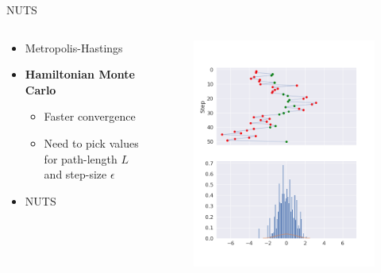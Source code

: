 \documentclass{beamer}
\begin{document}
\begin{frame}{NUTS}
\begin{columns}
\begin{column}{0.5\textwidth}
    \begin{itemize}
    \color{gray}
        \item Metropolis-Hastings
        \color{black}
        \item \textbf{Hamiltonian Monte Carlo}
        \begin{itemize}
            \item Faster convergence
            \item Need to pick values for path-length $L$ and step-size $\epsilon$
        \end{itemize}
        \color{gray}
        \item NUTS
    \end{itemize}
\end{column}
\begin{column}{0.5\textwidth}
\begin{figure}
    \centering
    \includegraphics[width=\linewidth]{samplingresult_hmc.png}
\end{figure}

\end{column}
\end{columns}
\end{frame}
\end{document}
